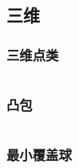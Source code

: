 \subsection{三维}
\subsubsection{三维点类}
\inputminted{cpp}{\source/geometry/3d/basis.cpp}
\subsubsection{凸包}
\inputminted{cpp}{\source/geometry/3d/convex.cpp}
\subsubsection{最小覆盖球}
\inputminted{cpp}{\source/geometry/3d/minball.cpp}
